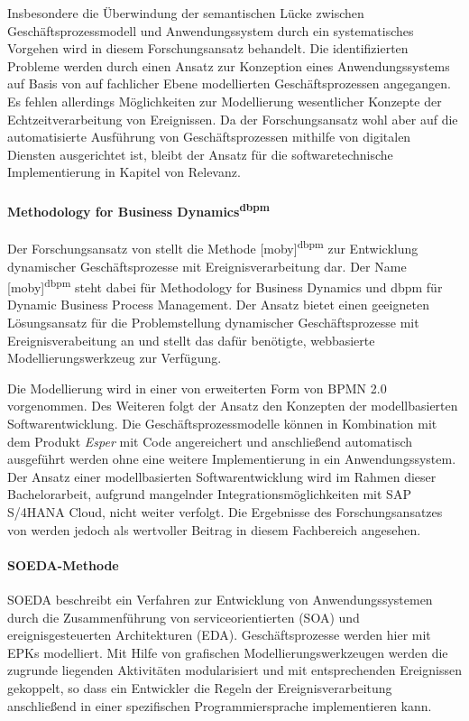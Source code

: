 Insbesondere die Überwindung der semantischen Lücke zwischen Geschäftsprozessmodell und Anwendungssystem durch ein systematisches Vorgehen wird in diesem Forschungsansatz behandelt. Die identifizierten Probleme werden durch einen Ansatz zur Konzeption eines Anwendungssystems auf Basis von auf fachlicher Ebene modellierten Geschäftsprozessen angegangen.  
Es fehlen allerdings Möglichkeiten zur Modellierung wesentlicher Konzepte der Echtzeitverarbeitung von Ereignissen.
Da der Forschungsansatz wohl aber auf die automatisierte Ausführung von Geschäftsprozessen mithilfe von digitalen Diensten ausgerichtet ist, bleibt der Ansatz für die softwaretechnische Implementierung in Kapitel von Relevanz. 

\paragraph{Methodology for Business Dynamics\textsuperscript{dbpm}}
Der Forschungsansatz von \citeauthor{Vidackovic.2014} stellt die  Methode [moby]\textsuperscript{dbpm} zur Entwicklung dynamischer Geschäftsprozesse mit Ereignisverarbeitung dar. Der Name [moby]\textsuperscript{dbpm} steht dabei für Methodology for Business Dynamics und dbpm für Dynamic Business Process Management. Der Ansatz bietet einen geeigneten Lösungsansatz für die Problemstellung dynamischer Geschäftsprozesse mit Ereignisverabeitung an und stellt das dafür benötigte, webbasierte Modellierungswerkzeug zur Verfügung. 
\cite{Vidackovic.2014}

Die Modellierung wird in einer von \citeauthor{Vidackovic.2014} erweiterten Form von \ac{BPMN} 2.0 vorgenommen. Des Weiteren folgt der Ansatz den Konzepten der modellbasierten Softwarentwicklung. Die Geschäftsprozessmodelle können in Kombination mit dem Produkt \textit{Esper} mit Code angereichert und anschließend automatisch ausgeführt werden ohne eine weitere Implementierung in ein Anwendungssystem. Der Ansatz einer modellbasierten Softwarentwicklung wird im Rahmen dieser Bachelorarbeit, aufgrund mangelnder Integrationsmöglichkeiten mit SAP S/4HANA Cloud, nicht weiter verfolgt. Die Ergebnisse des Forschungsansatzes von \citeauthor{Vidackovic.2014} werden jedoch als wertvoller Beitrag in diesem Fachbereich angesehen.  

\paragraph{SOEDA-Methode}
SOEDA beschreibt ein Verfahren zur Entwicklung von Anwendungssystemen durch die Zusammenführung von serviceorientierten (SOA) und ereignisgesteuerten Architekturen (EDA). Geschäftsprozesse werden hier mit \ac{EPK}s modelliert. 
\cite{MatthiasWieland.2009} 
Mit Hilfe von grafischen Modellierungswerkzeugen werden die zugrunde liegenden Aktivitäten modularisiert und mit entsprechenden Ereignissen gekoppelt, so dass ein Entwickler die Regeln der Ereignisverarbeitung anschließend in einer spezifischen Programmiersprache implementieren kann. 
\cite{Bruns.2010}

